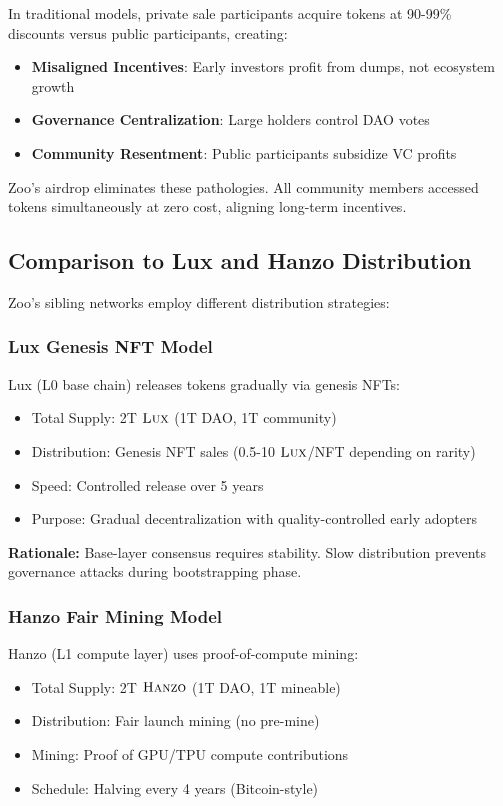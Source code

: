 In traditional models, private sale participants acquire tokens at 90-99\% discounts versus public participants, creating:
\begin{itemize}
\item \textbf{Misaligned Incentives}: Early investors profit from dumps, not ecosystem growth
\item \textbf{Governance Centralization}: Large holders control DAO votes
\item \textbf{Community Resentment}: Public participants subsidize VC profits
\end{itemize}

Zoo's airdrop eliminates these pathologies. All community members accessed tokens simultaneously at zero cost, aligning long-term incentives.

\subsection{Comparison to Lux and Hanzo Distribution}

Zoo's sibling networks employ different distribution strategies:

\subsubsection{Lux Genesis NFT Model}

Lux (L0 base chain) releases tokens gradually via genesis NFTs:
\begin{itemize}
\item Total Supply: 2T $\textsc{Lux}$ (1T DAO, 1T community)
\item Distribution: Genesis NFT sales (0.5-10 $\textsc{Lux}$/NFT depending on rarity)
\item Speed: Controlled release over 5 years
\item Purpose: Gradual decentralization with quality-controlled early adopters
\end{itemize}

\textbf{Rationale:} Base-layer consensus requires stability. Slow distribution prevents governance attacks during bootstrapping phase.

\subsubsection{Hanzo Fair Mining Model}

Hanzo (L1 compute layer) uses proof-of-compute mining:
\begin{itemize}
\item Total Supply: 2T $\textsc{Hanzo}$ (1T DAO, 1T mineable)
\item Distribution: Fair launch mining (no pre-mine)
\item Mining: Proof of GPU/TPU compute contributions
\item Schedule: Halving every 4 years (Bitcoin-style)
\end{itemize}

